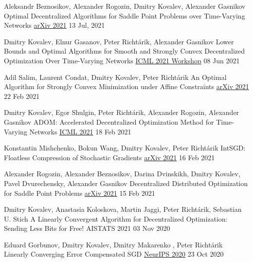 
\begin{cventries}
	

\cventry
{Aleksandr Beznosikov, Alexander Rogozin, Dmitry Kovalev, Alexander Gasnikov} %
{Optimal Decentralized Algorithms for Saddle Point Problems over Time-Varying Networks} %
{\href{https://arxiv.org/abs/2107.05957}{arXiv 2021}} 
{13 Jul, 2021} %
{}	

\cventry
{Dmitry Kovalev, Elnur Gasanov, Peter Richtárik, Alexander Gasnikov} %
{Lower Bounds and Optimal Algorithms for Smooth and Strongly Convex Decentralized Optimization Over Time-Varying Networks} %
{\href{http://federated-learning.org/fl-icml-2021/}{ICML 2021 Workshop}} 
{08 Jun 2021} %
{}	

\cventry
{Adil Salim, Laurent Condat, Dmitry Kovalev, Peter Richtárik} %
{An Optimal Algorithm for Strongly Convex Minimization under Affine Constraints} %
{\href{https://arxiv.org/abs/2102.11079}{arXiv 2021}} 
{22 Feb 2021} %
{}	

\cventry
{Dmitry Kovalev, Egor Shulgin, Peter Richtárik, Alexander Rogozin, Alexander Gasnikov} %
{ADOM: Accelerated Decentralized Optimization Method for Time-Varying Networks} %
{\href{http://proceedings.mlr.press/v139/kovalev21a}{ICML 2021}} 
{18 Feb 2021} %
{}	

\cventry
{Konstantin Mishchenko, Bokun Wang, Dmitry Kovalev, Peter Richtárik} %
{IntSGD: Floatless Compression of Stochastic Gradients} %
{\href{https://arxiv.org/abs/2102.08374}{arXiv 2021}} 
{16 Feb 2021} %
{}	

\cventry
{Alexander Rogozin, Alexander Beznosikov, Darina Dvinskikh, Dmitry Kovalev, Pavel Dvurechensky, Alexander Gasnikov} %
{Decentralized Distributed Optimization for Saddle Point Problems} %
{\href{https://arxiv.org/abs/2102.07758}{arXiv 2021}} 
{15 Feb 2021} %
{}	

\cventry
{Dmitry Kovalev, Anastasia Koloskova, Martin Jaggi, Peter Richtárik, Sebastian U. Stich} %
{A Linearly Convergent Algorithm for Decentralized Optimization: Sending Less Bits for Free!} %
{AISTATS 2021} 
{03 Nov 2020} %
{}	

\cventry
{Eduard Gorbunov, Dmitry Kovalev, Dmitry Makarenko , Peter Richtárik} %
{Linearly Converging Error Compensated SGD} %
{\href{https://papers.nips.cc/paper/2020/hash/ef9280fbc5317f17d480e4d4f61b3751-Abstract.html}{NeurIPS 2020}} 
{23 Oct 2020} %
{}	


\end{cventries}
